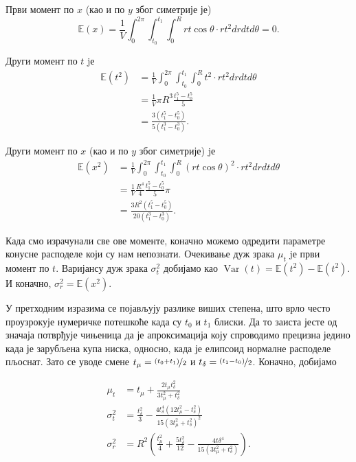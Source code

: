 \documentclass[12pt, a4paper, twoside]{book}
\numberwithin{equation}{chapter}
\numberwithin{theorem}{section}
\numberwithin{definition}{section}
\numberwithin{definitionChapter}{chapter}
\begin{document}
Први момент по $x$ (као и по $y$ због симетрије је)
\begin{equation}
	\mathbb{E}(x) = \frac{1}{V}\int_{0}^{2\pi}\int_{t_0}^{t_1}\int_{0}^{R}rt\cos\theta \cdot rt^2drdtd\theta = 0.
\end{equation}

Други момент по $t$ jе
\begin{equation}
	\begin{split}
		\mathbb{E}(t^2) & = \frac{1}{V}\int_{0}^{2\pi}\int_{t_0}^{t_1}\int_{0}^{R}t^2 \cdot rt^2drdtd\theta \\
			& = \frac{1}{V}\pi R^3\frac{t_1^5 - t_0^5}{5} \\
			& = \frac{3(t_1^5 - t_0^5)}{5(t_1^3 - t_0^3)}.
	\end{split}
\end{equation}

Други момент по $x$ (као и по $y$ због симетрије) jе
\begin{equation}
	\begin{split}
		\mathbb{E}(x^2) & = \frac{1}{V}\int_{0}^{2\pi}\int_{t_0}^{t_1}\int_{0}^{R}(rt\cos\theta)^2\cdot rt^2drdtd\theta \\
			& = \frac{1}{V}\frac{R^4}{4}\frac{t_1^5 - t_0^5}{5}\pi \\
			& = \frac{3R^2(t_1^5 - t_0^5)}{20(t_1^3 - t_0^3)}.
	\end{split}
\end{equation}

Када смо израчунали све ове моменте, коначно можемо одредити параметре конусне расподеле који су нам непознати.
Очекивање дуж зрака $\mu_t$ jе први момент по $t$. Варијансу дуж зрака $\sigma_t^2$ добијамо
као $\operatorname{Var}(t) = \mathbb{E}(t^2) - \mathbb{E}(t^2)$. И коначно, $\sigma_r^2 = \mathbb{E}(x^2)$.

У претходним изразима се појављују разлике виших степена, што врло често проузрокује нумеричке потешкоће
када су $t_0$ и $t_1$ блиски. Да то заиста јесте од значаја потврђује чињеница да је апроксимација коју
спроводимо прецизна једино када је зарубљена купа ниска, односно, када је елипсоид нормалне расподеле пљоснат.
Зато се уводе смене $t_\mu = \nicefrac{(t_0 + t_1)}{2}$ и $t_\delta = \nicefrac{(t_1 - t_0)}{2}$.
Коначно, добијамо

\begin{equation}
	\begin{split}
		\mu_t & = t_\mu + \frac{2t_\mu t_\delta^2}{3t_\mu^2 + t_\delta^2} \\
		\sigma_t^2 & = \frac{t_\delta^2}{3} - \frac{4t_\delta^4(12t_\mu^2 - t_\delta^2)}{15(3t_\mu^2 + t_\delta^2)^2} \\
		\sigma_r^2 & = R^2 \left(\frac{t_\mu^2}{4} + \frac{5t_\delta^2}{12} - \frac{4t\delta^4}{15(3t_\mu^2 + t_\delta^2)}\right).
	\end{split}
\end{equation}
\end{document}
